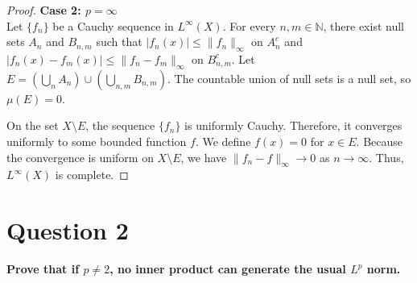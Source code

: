 \documentclass[11pt,en]{elegantpaper}
\begin{document}
\begin{proof}
\textbf{Case 2: $p = \infty$} \\
Let $\{f_n\}$ be a Cauchy sequence in $L^\infty(X)$. For every $n, m \in \mathbb{N}$, there exist null sets $A_n$ and $B_{n,m}$ such that $|f_n(x)| \le \|f_n\|_\infty$ on $A_n^c$ and $|f_n(x) - f_m(x)| \le \|f_n - f_m\|_\infty$ on $B_{n,m}^c$. Let $E = \left(\bigcup_n A_n\right) \cup \left(\bigcup_{n,m} B_{n,m}\right)$. The countable union of null sets is a null set, so $\mu(E) = 0$.

On the set $X \setminus E$, the sequence $\{f_n\}$ is uniformly Cauchy. Therefore, it converges uniformly to some bounded function $f$. We define $f(x) = 0$ for $x \in E$. 
Because the convergence is uniform on $X \setminus E$, we have $\|f_n - f\|_\infty \to 0$ as $n \to \infty$. Thus, $L^\infty(X)$ is complete.
\end{proof}

\vspace{0.5cm}

\section*{Question 2}
\textbf{Prove that if $p \neq 2$, no inner product can generate the usual $L^p$ norm.}
\end{document}
